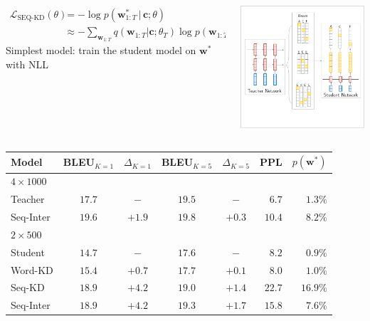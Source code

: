 \documentclass{beamer}
\newcommand{\air}{\vspace{0.25cm}}
\newcommand{\given}{\,|\,}
\newcommand{\wvec}{\mathbf{w}}
\newcommand{\cvec}{\mathbf{c}}
\begin{document}
\begin{frame}
\centerline{}
\air
\air  
\begin{columns}
\begin{column}{5.5cm}
\begin{align*}
\mathcal{L}_\text{SEQ-KD}(\theta) &= -\log p(\wvec^*_{1:T} \given \cvec ; \theta)  \\
& \displaystyle \approx   -\sum_{\wvec_{1:T}} q(\wvec_{1:T} | \cvec; \theta_T) \log p(\wvec_{1:T} | \cvec ; \theta)
\end{align*}
Simplest model: train the student model on $\wvec^*$ with NLL
\end{column}
\begin{column}{5.5cm}
\includegraphics[width=5.5cm]{seq-kd-2}
\end{column}
\end{columns}
\end{frame}

\begin{frame}
\centerline{}
\air
\air
\begin{table}
\centering
\small
\begin{tabular}{lccccrr}
\toprule
Model &    BLEU$_{K=1}$   & $\Delta_{K=1}$ & BLEU$_{K=5}$ & $\Delta_{K=5}$ & PPL & $p(\wvec^*)$ \\
\midrule
$4 \times 1000$ \\
Teacher    & $17.7$ &  $-$ & $19.5$&   $-$ &   $6.7$ &  $1.3\%$ \\
\hspace{1mm} Seq-Inter    & $19.6$ & $+1.9$&  $19.8$& $+0.3$&   $10.4$ & $8.2\%$   \\
\midrule
$2 \times 500$ \\ 
Student  $\,$   & $14.7$ & $-$ & $17.6$&  $-$ &  $8.2$ & $0.9\%$  \\
\hspace{1mm} Word-KD  & $15.4$ & $+0.7$& $17.7$& $+0.1$&  $8.0$ & $1.0\%$  \\
\hspace{1mm} Seq-KD   & $18.9$ & $+\mathbf{4.2}$& $19.0$& $+1.4$&  $22.7$ & $16.9\%$ \\
\hspace{1mm} Seq-Inter  & $18.9$ & $+\mathbf{4.2}$&$19.3$ & $+\mathbf{1.7}$ &  $15.8$ & $7.6\%$  \\
\bottomrule
\end{tabular}

\end{table}
\air
\air
\end{frame}
\end{document}

